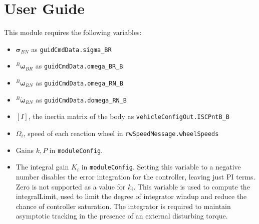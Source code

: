 \documentclass[]{BasiliskReportMemo}
\begin{document}
\section{User Guide}
This module requires the following variables:
\begin{itemize}
\item $\mathbf{\sigma}_{BN}$ as \verb|guidCmdData.sigma_BR|
\item $^B\mathbf{\omega}_{BR}$  as \verb|guidCmdData.omega_BR_B|
\item $^B\mathbf{\omega}_{RN}$ as \verb|guidCmdData.omega_RN_B|
\item $^B\dot{\mathbf{\omega}}_{RN}$ as \verb|guidCmdData.domega_RN_B|
\item $[I]$, the inertia matrix of the body as \verb|vehicleConfigOut.ISCPntB_B|
\item $\Omega_i$, speed of each reaction wheel in \verb|rwSpeedMessage.wheelSpeeds|
\item Gains $k,P$ in \verb|moduleConfig|. 
\item The integral gain $K_i$ in \verb|moduleConfig|. Setting this variable to a negative number disables the error integration for the controller, leaving just PI terms. Zero is not supported as a value for $k_i$. This variable is used to compute the integralLimit, used to limit the degree of integrator windup and reduce the chance of controller saturation. The integrator is required to maintain asymptotic tracking in the presence of an external disturbing torque.
\end{itemize}



\end{document}
